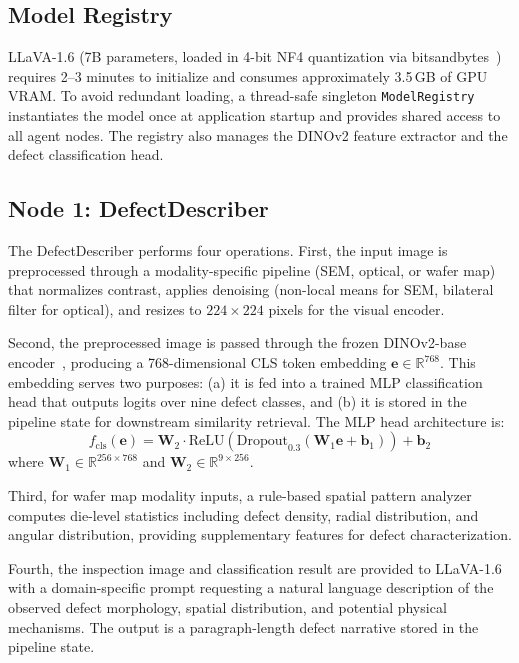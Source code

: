 \documentclass[conference]{IEEEtran}
\begin{document}
\subsection{Model Registry}

LLaVA-1.6 (7B parameters, loaded in 4-bit NF4 quantization via bitsandbytes~\cite{dettmers2023qlora}) requires 2--3 minutes to initialize and consumes approximately 3.5\,GB of GPU VRAM.
To avoid redundant loading, a thread-safe singleton \texttt{ModelRegistry} instantiates the model once at application startup and provides shared access to all agent nodes.
The registry also manages the DINOv2 feature extractor and the defect classification head.

\subsection{Node 1: DefectDescriber}
\label{sec:defect_describer}

The DefectDescriber performs four operations.
First, the input image is preprocessed through a modality-specific pipeline (SEM, optical, or wafer map) that normalizes contrast, applies denoising (non-local means for SEM, bilateral filter for optical), and resizes to $224 \times 224$ pixels for the visual encoder.

Second, the preprocessed image is passed through the frozen DINOv2-base encoder~\cite{oquab2024dinov2}, producing a 768-dimensional CLS token embedding $\mathbf{e} \in \mathbb{R}^{768}$.
This embedding serves two purposes: (a) it is fed into a trained MLP classification head that outputs logits over nine defect classes, and (b) it is stored in the pipeline state for downstream similarity retrieval.
The MLP head architecture is:
\begin{equation}
    f_{\text{cls}}(\mathbf{e}) = \mathbf{W}_2 \cdot \text{ReLU}(\text{Dropout}_{0.3}(\mathbf{W}_1 \mathbf{e} + \mathbf{b}_1)) + \mathbf{b}_2
\end{equation}
where $\mathbf{W}_1 \in \mathbb{R}^{256 \times 768}$ and $\mathbf{W}_2 \in \mathbb{R}^{9 \times 256}$.

Third, for wafer map modality inputs, a rule-based spatial pattern analyzer~\cite{wu2015wafer} computes die-level statistics including defect density, radial distribution, and angular distribution, providing supplementary features for defect characterization.

Fourth, the inspection image and classification result are provided to LLaVA-1.6 with a domain-specific prompt requesting a natural language description of the observed defect morphology, spatial distribution, and potential physical mechanisms.
The output is a paragraph-length defect narrative stored in the pipeline state.
\end{document}
